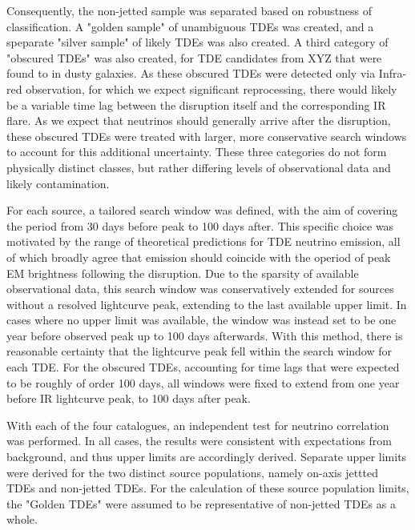 \documentclass{PoS}
\begin{document}
Consequently, the non-jetted sample was separated based on robustness of classification. A "golden sample" of unambiguous TDEs was created, and a speparate "silver sample" of likely TDEs was also created. A third category of "obscured TDEs" was also created, for TDE candidates from XYZ that were found to in dusty galaxies. As these obscured TDEs were detected only via Infra-red observation, for which we expect significant reprocessing, there would likely be a variable time lag between the disruption itself and the corresponding IR flare. As we expect that neutrinos should generally arrive after the disruption, these obscured TDEs were treated with larger, more conservative search windows to account for this additional uncertainty. These three categories do not form physically distinct classes, but rather differing levels of observational data and likely contamination.

For each source, a tailored search window was defined, with the aim of covering the period from 30 days before peak to 100 days after. This specific choice was motivated by the range of theoretical predictions for TDE neutrino emission, all of which broadly agree that emission should coincide with the operiod of peak EM brightness following the disruption. Due to the sparsity of available observational data, this search window was conservatively extended for sources without a resolved lightcurve peak, extending to the last available upper limit. In cases where no upper limit was available, the window was instead set to be one year before observed peak up to 100 days afterwards. With this method, there is reasonable certainty that the lightcurve peak fell within the search window for each TDE. For the obscured TDEs, accounting for time lags that were expected to be roughly of order 100 days, all windows were fixed to extend from one year before IR lightcurve peak, to 100 days after peak.

With each of the four catalogues, an independent test for neutrino correlation was performed. In all cases, the results were consistent with expectations from background, and thus upper limits are accordingly derived. Separate upper limits were derived for the two distinct source populations, namely on-axis jettted TDEs and non-jetted TDEs. For the calculation of these source population limits, the "Golden TDEs" were assumed to be representative of non-jetted TDEs as a whole. 
\end{document}
